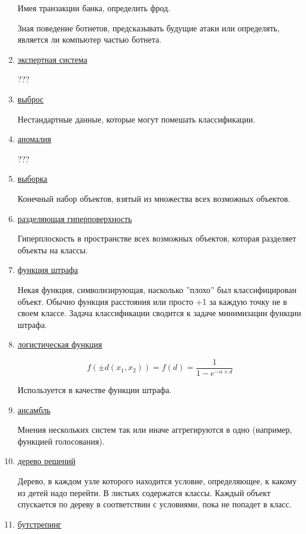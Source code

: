 \documentclass{proc}
\begin{document}
\begin{enumerate}
		Имея транзакции банка, определить фрод.
		
		Зная поведение ботнетов, предсказывать будущие атаки или определять, является ли компьютер частью ботнета.
		
		\item \uline{экспертная система}
		
		???
		
		\item \uline{выброс}
		
		Нестандартные данные, которые могут помешать классификации.
		
		\item \uline{аномалия}
		
		???
		
		\item \uline{выборка}
		
		Конечный набор объектов, взятый из множества всех возможных объектов.
		
		\item \uline{разделяющая гиперповерхность}
		
		Гиперплоскость в пространстве всех возможных объектов, которая разделяет объекты на классы.
		
		\item \uline{функция штрафа}
		
		Некая функция, символизирующая, насколько ''плохо'' был классифицирован объект. Обычно функция расстояния или просто +1 за каждую точку не в своем классе. Задача классификации сводится к задаче минимизации функции штрафа.
		
		\item \uline{логистическая функция}
		
		$$f(\pm d(x_1,x_2))=f(d)=\frac{1}{1-e^{-\alpha \times d}}$$
		
		Используется в качестве функции штрафа.
		
		\item \uline{ансамбль}
		
		Мнения нескольких систем так или иначе аггрегируются в одно (например, функцией голосования).
		
		\item \uline{дерево решений}
		
		Дерево, в каждом узле которого находится условие, определяющее, к какому из детей надо перейти. В листьях содержатся классы. Каждый объект спускается по дереву в соответствии с условиями, пока не попадет в класс.
		
		\item \uline{бутстрепинг}
		

\end{enumerate}
\end{document}

